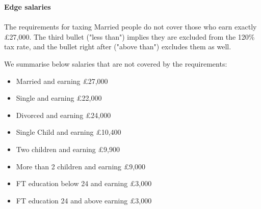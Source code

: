 \textbf{Edge salaries\\}
\\
The requirements for taxing Married people do not cover those who earn exactly £27,000. The third bullet ("less than") implies they are excluded from the 120\% tax rate, and the bullet right after ("above than") excludes them as well. 
\par
We summarise below salaries that are not covered by the requirements:  
\begin{itemize}%
	\item Married and earning £27,000
	\item Single and earning £22,000
	\item Divorced and earning £24,000
	\item Single Child and earning £10,400
	\item Two children and earning £9,900
	\item More than 2 children and earning £9,000
	\item FT education below 24 and earning £3,000
	\item FT education 24 and above earning £3,000
\end{itemize}

